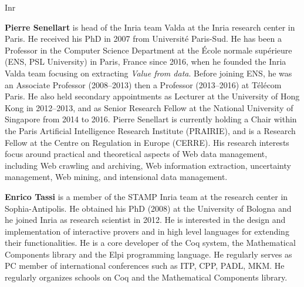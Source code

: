 \begin{sitedescription}{Inr}
\begin{compactitem}
\item{\bf Pierre Senellart} is head of the Inria team Valda at the Inria
  research center in Paris. He
  received his PhD in 2007 from Université Paris-Sud. He has been a
    Professor in the Computer Science Department at the École normale
    supérieure (ENS, PSL University) in Paris, France since 2016, when he
    founded the Inria Valda team focusing on extracting \emph{Value from
    data}. Before joining ENS, he was an Associate Professor (2008–2013)
    then a Professor (2013–2016) at Télécom Paris. He also held secondary
    appointments as Lecturer at the University of Hong Kong in 2012–2013,
    and as Senior Research Fellow at the National University of Singapore
    from 2014 to 2016. Pierre Senellart is currently holding a Chair
    within the Paris Artificial Intelligence Research Institute
    (PRAIRIE), and is a Research Fellow at the Centre on Regulation in
    Europe (CERRE).
    His research interests
    focus around practical and theoretical aspects of Web data
    management, including Web crawling and archiving, Web information
    extraction, uncertainty management, Web mining, and intensional data
    management.

\item{\bf Enrico Tassi} is a member of the STAMP Inria team at the research
center in Sophia-Antipolis. He obtained his PhD (2008) at the University of
Bologna and he joined Inria as research scientist in 2012.
He is interested in the design and implementation of interactive
provers and in high level languages for extending their functionalities.
He is a core developer of the Coq system, the Mathematical Components library
and the Elpi programming language. He regularly serves as PC member of
international conferences such as ITP, CPP, PADL, MKM. He regularly organizes
schools on Coq and the Mathematical Components library.


\end{compactitem}
\end{sitedescription}
